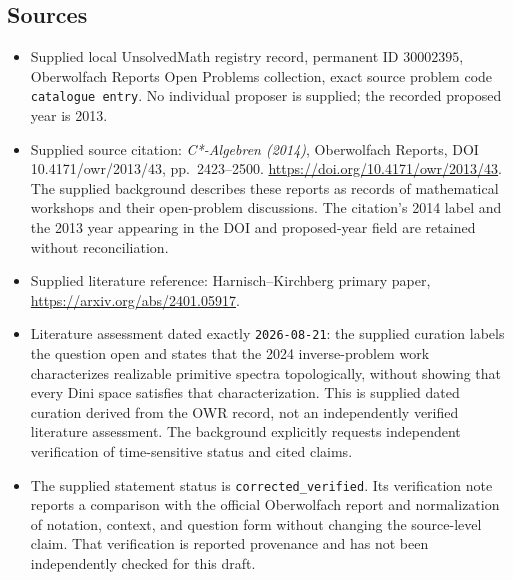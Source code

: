 \documentclass[11pt]{article}
\begin{document}
\subsection{Sources}
\begin{itemize}
\item Supplied local UnsolvedMath registry record, permanent ID \(30002395\), Oberwolfach Reports Open Problems collection, exact source problem code \texttt{catalogue entry}. No individual proposer is supplied; the recorded proposed year is 2013.
\item Supplied source citation: \emph{C*-Algebren (2014)}, Oberwolfach Reports, DOI 10.4171/owr/2013/43, pp.\ 2423--2500. \url{https://doi.org/10.4171/owr/2013/43}. The supplied background describes these reports as records of mathematical workshops and their open-problem discussions. The citation's 2014 label and the 2013 year appearing in the DOI and proposed-year field are retained without reconciliation.
\item Supplied literature reference: Harnisch--Kirchberg primary paper, \url{https://arxiv.org/abs/2401.05917}.
\item Literature assessment dated exactly \texttt{2026-08-21}: the supplied curation labels the question open and states that the 2024 inverse-problem work characterizes realizable primitive spectra topologically, without showing that every Dini space satisfies that characterization. This is supplied dated curation derived from the OWR record, not an independently verified literature assessment. The background explicitly requests independent verification of time-sensitive status and cited claims.
\item The supplied statement status is \texttt{corrected\_verified}. Its verification note reports a comparison with the official Oberwolfach report and normalization of notation, context, and question form without changing the source-level claim. That verification is reported provenance and has not been independently checked for this draft.
\end{itemize}
\end{document}
